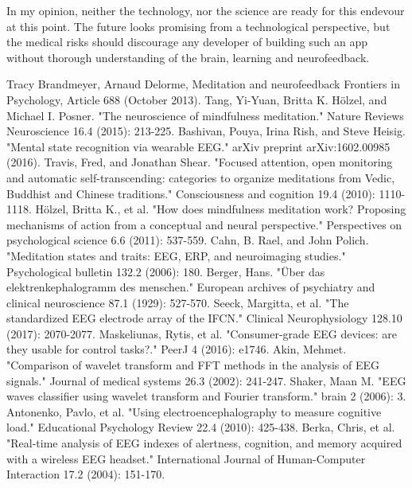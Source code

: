 \documentclass{llncs} %
\begin{document}
In my opinion, neither the technology, nor the science are ready for this endevour at this point. The future looks promising from a technological perspective, but the medical risks should discourage any developer of building such an app without thorough understanding of the brain, learning and neurofeedback.
\newpage
\begin{thebibliography}{[MT1]}
    Tracy Brandmeyer, Arnaud Delorme,
    Meditation and neurofeedback
    Frontiers in Psychology, Article 688 (October 2013).
    Tang, Yi-Yuan, Britta K. Hölzel, and Michael I. Posner. "The neuroscience of mindfulness meditation." Nature Reviews Neuroscience 16.4 (2015): 213-225.
    Bashivan, Pouya, Irina Rish, and Steve Heisig. "Mental state recognition via wearable EEG." arXiv preprint arXiv:1602.00985 (2016).    
    Travis, Fred, and Jonathan Shear. "Focused attention, open monitoring and automatic self-transcending: categories to organize meditations from Vedic, Buddhist and Chinese traditions." Consciousness and cognition 19.4 (2010): 1110-1118.
    Hölzel, Britta K., et al. "How does mindfulness meditation work? Proposing mechanisms of action from a conceptual and neural perspective." Perspectives on psychological science 6.6 (2011): 537-559.
    Cahn, B. Rael, and John Polich. "Meditation states and traits: EEG, ERP, and neuroimaging studies." Psychological bulletin 132.2 (2006): 180.
    Berger, Hans. "Über das elektrenkephalogramm des menschen." European archives of psychiatry and clinical neuroscience 87.1 (1929): 527-570.
    Seeck, Margitta, et al. "The standardized EEG electrode array of the IFCN." Clinical Neurophysiology 128.10 (2017): 2070-2077.
    Maskeliunas, Rytis, et al. "Consumer-grade EEG devices: are they usable for control tasks?." PeerJ 4 (2016): e1746.
    Akin, Mehmet. "Comparison of wavelet transform and FFT methods in the analysis of EEG signals." Journal of medical systems 26.3 (2002): 241-247.
    Shaker, Maan M. "EEG waves classifier using wavelet transform and Fourier transform." brain 2 (2006): 3.
    Antonenko, Pavlo, et al. "Using electroencephalography to measure cognitive load." Educational Psychology Review 22.4 (2010): 425-438.
    Berka, Chris, et al. "Real-time analysis of EEG indexes of alertness, cognition, and memory acquired with a wireless EEG headset." International Journal of Human-Computer Interaction 17.2 (2004): 151-170.

\end{thebibliography}
\end{document}
